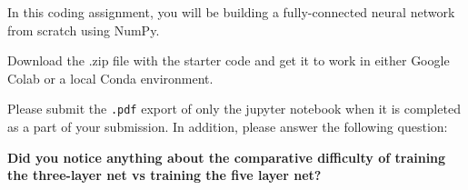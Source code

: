 
In this coding assignment, you will be building a fully-connected neural network from scratch using NumPy.

Download the .zip file with the starter code and get it to work in either Google Colab or a local Conda environment. 



Please submit the \texttt{.pdf} export of only the jupyter notebook when it is completed as a part of your submission. In addition, please answer the following question:

\begin{enumerate}
    \qitem \textbf{Did you notice anything about the comparative difficulty of training the three-layer net vs training the five layer net?}
\end{enumerate}

